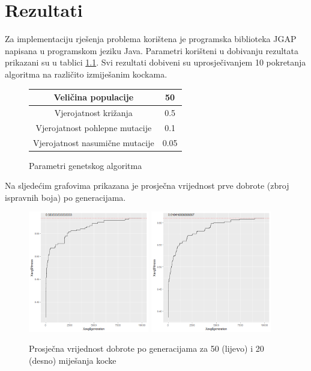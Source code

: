 \documentclass[times, utf8, seminar, numeric]{fer}
\begin{document}
\chapter{Rezultati}
Za implementaciju rješenja problema korištena je programska biblioteka JGAP\cite{jgap} napisana u programskom jeziku Java. Parametri korišteni u dobivanju rezultata prikazani su u tablici \ref{parameters}. Svi rezultati dobiveni su uprosječivanjem 10 pokretanja algoritma na različito izmiješanim kockama.

\begin{figure}[h]
\centering
\begin{tabular}{|c|c|}\hline
Veličina populacije & 50\\\hline
Vjerojatnost križanja & 0.5\\\hline
Vjerojatnost pohlepne mutacije & 0.1\\\hline
Vjerojatnost nasumične mutacije & 0.05\\\hline
\end{tabular}
\caption{Parametri genetskog algoritma}
\label{parameters}
\end{figure}

Na sljedećim grafovima prikazana je prosječna vrijednost prve dobrote (zbroj ispravnih boja) po generacijama.

  		\begin{figure}[h]
			\centering
			\includegraphics[width=0.47\textwidth]{../results/sumsides_fitness/50_scrambles/cross0,5greedy10mut20.png}
			\includegraphics[width=0.47\textwidth]{../results/sumsides_fitness/20_scrambles/cross0,5greedy10mut20.png}
			\caption{Prosječna vrijednost dobrote po generacijama za 50 (lijevo) i 20 (desno) miješanja kocke }
		\end{figure}
		
\end{document}
